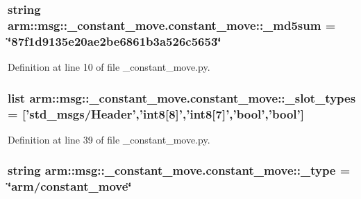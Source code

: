 \subsubsection[{\-\_\-md5sum}]{\setlength{\rightskip}{0pt plus 5cm}string {\bf arm\-::msg\-::\-\_\-constant\-\_\-move.\-constant\-\_\-move\-::\-\_\-md5sum} = \char`\"{}87f1d9135e20ae2be6861b3a526c5653\char`\"{}\hspace{0.3cm}{\ttfamily  [static, private]}}\label{classarm_1_1msg_1_1__constant__move_1_1constant__move_a6a5ea71f836b8c020320a422ad0db9c5}


\-Definition at line 10 of file \-\_\-constant\-\_\-move.\-py.

\subsubsection[{\-\_\-slot\-\_\-types}]{\setlength{\rightskip}{0pt plus 5cm}list {\bf arm\-::msg\-::\-\_\-constant\-\_\-move.\-constant\-\_\-move\-::\-\_\-slot\-\_\-types} = ['std\-\_\-msgs/\-Header','int8[8]','int8[7]','bool','bool']\hspace{0.3cm}{\ttfamily  [static, private]}}\label{classarm_1_1msg_1_1__constant__move_1_1constant__move_a932060afe463d3f5a0c18a1742621a76}


\-Definition at line 39 of file \-\_\-constant\-\_\-move.\-py.

\subsubsection[{\-\_\-type}]{\setlength{\rightskip}{0pt plus 5cm}string {\bf arm\-::msg\-::\-\_\-constant\-\_\-move.\-constant\-\_\-move\-::\-\_\-type} = \char`\"{}arm/{\bf constant\-\_\-move}\char`\"{}\hspace{0.3cm}{\ttfamily  [static, private]}}\label{classarm_1_1msg_1_1__constant__move_1_1constant__move_ac91bcb46f761fa4cabd83bd1334c1ff4}


